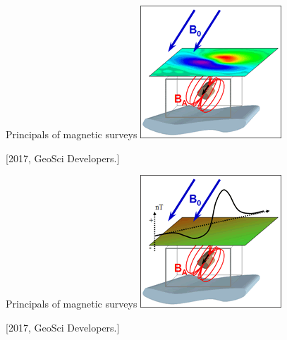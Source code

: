     \begin{frame}
      \begin{PointSix}{Principals of magnetic surveys}
        \includegraphics[width=0.80\linewidth]{Figures/Magnetics/magnetic_anomaly.png}

      \tiny [2017, GeoSci Developers.]
      \end{PointSix}
    \end{frame}

    \begin{frame}
      \begin{PointSix}{Principals of magnetic surveys}
        \includegraphics[width=0.80\linewidth]{Figures/Magnetics/measurements.png}

      \tiny [2017, GeoSci Developers.]
      \end{PointSix}
    \end{frame}

